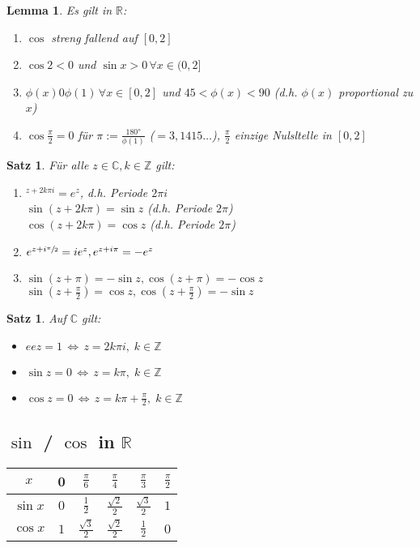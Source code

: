 \documentclass[ngerman,a4paper]{report}
\theoremstyle{break}
\newtheorem{lemma}[theorem]{Lemma}
\newtheorem{satz}[theorem]{Satz}
\begin{document}
\begin{lemma}
	Es gilt in $\mathbb{R}$:
	\begin{enumerate}[label={\arabic*)}]
		\item $\cos$ streng fallend auf $[0,2]$
		\item $\cos 2 < 0$ und $\sin x > 0\,\forall x\in (0,2]$
		\item $\phi(x) 0 \phi(1) \,\forall x\in [0,2]$ und $45 < \phi(x) < 90$ (d.h. $\phi(x)$ proportional zu $x$)
		\item $\cos \frac{\pi}{2} = 0$ für $\pi := \frac{180°}{\phi(1)}$ ($=3,1415\dotsc$), $\frac{\pi}{2}$ einzige Nulsltelle in $[0,2]$
	\end{enumerate}
\end{lemma}
\begin{satz}
	Für alle $z\in\mathbb{C}, k\in\mathbb{Z}$ gilt:
	\begin{enumerate}[label={\arabic*)}]
		\item $^{z+2k\pi i} = e^z$, d.h. Periode $2\pi i$\\
		$\sin(z+2k\pi) = \sin z$ (d.h. Periode $2\pi$)\\
		$\cos(z+2k\pi) = \cos z$ (d.h. Periode $2\pi$)
		\item $e^{z+i\sfrac{\pi}{2}} = ie^z, e^{z+i\pi} = -e^z$
		\item $\sin(z+\pi) = -\sin z, \cos(z+\pi) = -\cos z$\\
		$\sin\left(z+\frac{\pi}{2}\right) = \cos z, \cos\left(z+\frac{\pi}{2}\right) = -\sin z$
	\end{enumerate}
\end{satz}

\begin{satz}
	Auf $\mathbb{C}$ gilt:
	\begin{itemize}
		\item $eez = 1 \,\Leftrightarrow\,z=2k\pi i,\;k\in\mathbb{Z}$
		\item $\sin z = 0\,\Leftrightarrow\,z=k\pi,\;k\in\mathbb{Z}$
		\item $\cos z = 0\,\Leftrightarrow\,z =k\pi + \frac{\pi}{2},\;k\in\mathbb{Z}$
	\end{itemize}
\end{satz}
\subsection*{$\sin$ / $\cos$ in $\mathbb{R}$}
\begin{centering}
	\begin{tabular}{c|ccccc}
		\toprule
		$x$ & 0 & $\frac{\pi}{6}$ & $\frac{\pi}{4}$ & $\frac{\pi}{3}$ & $\frac{\pi}{2}$ \\
		\midrule
		$\sin x$ & $0$ & $\frac{1}{2}$ & $\frac{\sqrt{2}}{2}$ & $\frac{\sqrt{3}}{2}$ & $1$ \\
		$\cos x$ & $1$ & $\frac{\sqrt{3}}{2}$ & $\frac{\sqrt{2}}{2}$ & $\frac{1}{2}$ & $0$ \\
		\bottomrule
	\end{tabular}
\end{centering}
\end{document}
